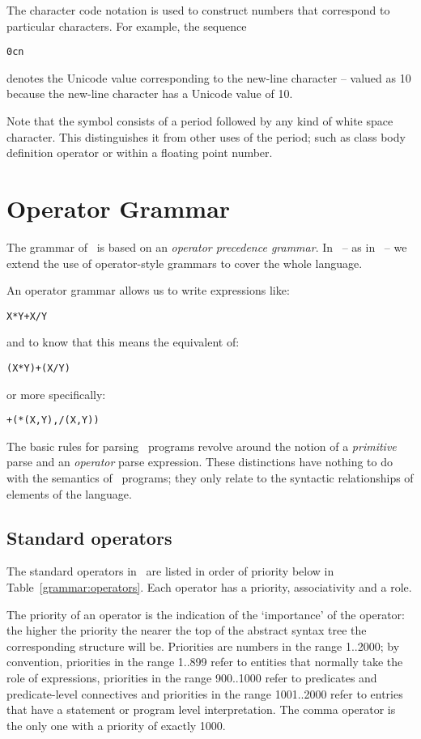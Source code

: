 The character code notation is used to construct numbers that correspond to particular characters. For example, the sequence
\begin{alltt}
0c\bsl{}n
\end{alltt}
denotes the Unicode value corresponding to the new-line character -- valued as 10 because the new-line character has a Unicode value of 10.

\noindent
Note that the \dotspace symbol consists of a period followed by any kind of white space character. This distinguishes it from other uses of the period; such as class body definition operator  or within a floating point number.

\section{Operator Grammar}
\label{parser:grammar}
The grammar of \go\ is based on an \emph{operator precedence grammar}. In \go\ -- as in \prolog\ -- we extend the use of operator-style grammars to cover the whole language.

An operator grammar allows us to write expressions like:
\begin{alltt}
X * Y + X / Y
\end{alltt}
and to know that this means the equivalent of:
\begin{alltt}
(X * Y) + (X / Y)
\end{alltt}
or more specifically:
\begin{alltt}
+(*(X, Y), /(X, Y))
\end{alltt}
The basic rules for parsing \go\ programs revolve around the notion of a {\em primitive} parse and an {\em operator} parse expression. These distinctions have nothing to do with the semantics of \go\ programs; they only relate to the syntactic relationships of elements of the language.

\subsection{Standard operators}   
The standard operators in \go\ are listed in order of priority below in Table~\ref{grammar:operators}. Each operator has a priority, associativity and a role.

The priority of an operator is the indication of the `importance' of the operator: the higher the priority the nearer the top of the abstract syntax tree the corresponding structure will be. Priorities are numbers in the range 1..2000; by convention, priorities in the range 1..899 refer to entities that normally take the role of expressions, priorities in the range 900..1000 refer to predicates and predicate-level connectives and priorities in the range 1001..2000 refer to entries that have a statement or program level interpretation. The comma operator is the only one with a priority of exactly 1000.

